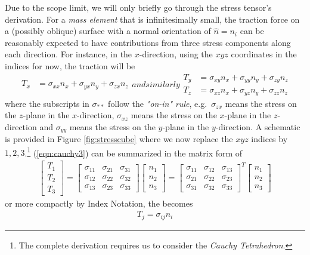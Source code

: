 Due to the scope limit, we will only briefly go through the stress tensor's derivation. For a \textit{mass element} that is infinitesimally small, the traction force on a (possibly oblique) surface with a normal orientation of $\hat{n} = n_i$ can be reasonably expected to have contributions from three stress components along each direction. For instance, in the $x$-direction, using the $xyz$ coordinates in the indices for now, the traction will be
\begin{subequations}
\label{eqn:cauchy3}
\begin{align}
T_x &= \sigma_{xx}n_x + \sigma_{yx}n_y + \sigma_{zx}n_z
\end{align}
and similarly
\begin{align}
T_y &= \sigma_{xy}n_x + \sigma_{yy}n_y + \sigma_{zy}n_z \\
T_z &= \sigma_{xz}n_x + \sigma_{yz}n_y + \sigma_{zz}n_z 
\end{align}
\end{subequations}
where the subscripts in $\sigma_{**}$ follow the \textit{"on-in" rule}, e.g.\ $\sigma_{zx}$ means the stress on the $z$-plane in the $x$-direction, $\sigma_{xz}$ means the stress on the $x$-plane in the $z$-direction and $\sigma_{yy}$ means the stress on the $y$-plane in the $y$-direction. A schematic is provided in Figure \ref{fig:stresscube} where we now replace the $xyz$ indices by $1,2,3$.\footnote{The complete derivation requires us to consider the \textit{Cauchy Tetrahedron}.} (\ref{eqn:cauchy3}) can be summarized in the matrix form of
\begin{align}
\begin{bmatrix}
T_1 \\
T_2 \\
T_3
\end{bmatrix}  
=
\begin{bmatrix}
\sigma_{11} & \sigma_{21} & \sigma_{31} \\
\sigma_{12} & \sigma_{22} & \sigma_{32} \\
\sigma_{13} & \sigma_{23} & \sigma_{33}
\end{bmatrix}
\begin{bmatrix}
n_1 \\
n_2 \\
n_3
\end{bmatrix}
=
\begin{bmatrix}
\sigma_{11} & \sigma_{12} & \sigma_{13} \\
\sigma_{21} & \sigma_{22} & \sigma_{23} \\
\sigma_{31} & \sigma_{32} & \sigma_{33}
\end{bmatrix}^T
\begin{bmatrix}
n_1 \\
n_2 \\
n_3
\end{bmatrix}
\label{eqn:cauchyT}
\end{align}
or more compactly by Index Notation, the  becomes
\begin{align}
T_j = \sigma_{ij}n_i \label{eqn:Cauchyform}
\end{align}

